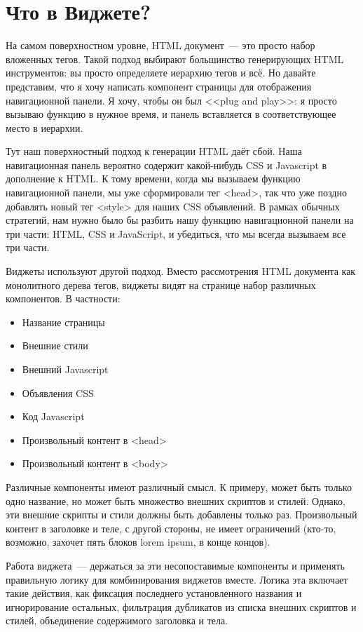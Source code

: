 \section{Что в Виджете?}
На самом поверхностном уровне, HTML документ~--- это просто набор вложенных
тегов. Такой подход выбирают большинство генерирующих HTML инструментов: вы
просто определяете иерархию тегов и всё. Но давайте представим, что я хочу
написать компонент страницы для отображения навигационной панели. Я хочу, чтобы
он был <<plug and play>>: я просто вызываю функцию в нужное время, и панель
вставляется в соответствующее место в иерархии.

Тут наш поверхностный подход к генерации HTML даёт сбой. Наша навигационная
панель вероятно содержит какой-нибудь CSS и Javascript в дополнение к HTML. К
тому времени, когда мы вызываем функцию навигационной панели, мы уже
сформировали тег <head>, так что уже поздно добавлять новый тег <style> для
наших CSS объявлений. В рамках обычных стратегий, нам нужно было бы разбить
нашу функцию навигационной панели на три части: HTML, CSS и JavaScript, и
убедиться, что мы всегда вызываем все три части.

Виджеты используют другой подход. Вместо рассмотрения HTML документа как
монолитного дерева тегов, виджеты видят на странице набор различных
компонентов. В частности:
\begin{itemize}
    \item Название страницы
    \item Внешние стили
    \item Внешний Javascript
    \item Объявления CSS
    \item Код Javascript
    \item Произвольный контент в <head>
    \item Произвольный контент в <body>
\end{itemize}

Различные компоненты имеют различный смысл. К примеру, может быть только одно
название, но может быть множество внешних скриптов и стилей. Однако, эти
внешние скрипты и стили должны быть добавлены только раз. Произвольный контент
в заголовке и теле, с другой стороны, не имеет ограничений (кто-то, возможно,
захочет пять блоков lorem ipsum, в конце концов).

Работа виджета~--- держаться за эти несопоставимые компоненты и применять
правильную логику для комбинирования виджетов вместе. Логика эта включает такие
действия, как фиксация последнего установленного названия и игнорирование
остальных, фильтрация дубликатов из списка внешних скриптов и стилей,
объединение содержимого заголовка и тела.

